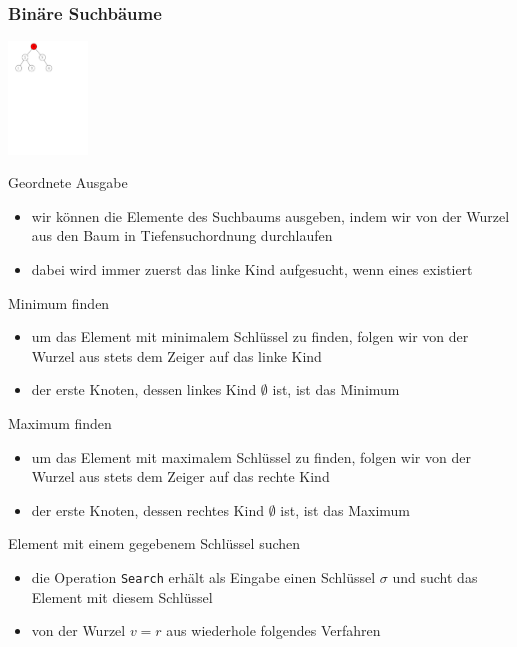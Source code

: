 \documentclass[aspectratio=1610, 11pt]{beamer}
\newcommand{\mytitle}{Bin\"are Suchb\"aume}
\begin{document}
\begin{frame}\frametitle{\mytitle}
	\hfill\includegraphics[height=30mm]{./images/binary_searchtree.pdf}
	\begin{overprint}
		\begin{exampleblock}{Geordnete Ausgabe}
			\begin{itemize}
				\item wir k\"onnen die Elemente des Suchbaums ausgeben, indem wir von der Wurzel aus den Baum in Tiefensuchordnung durchlaufen
				\item dabei wird immer \alert{zuerst} das linke Kind aufgesucht, wenn eines existiert
			\end{itemize}
		\end{exampleblock}
		\begin{exampleblock}{Minimum finden}
			\begin{itemize}
				\item um das Element mit minimalem Schl\"ussel zu finden, folgen wir von der Wurzel aus stets dem Zeiger auf das linke Kind
				\item der erste Knoten, dessen linkes Kind $\emptyset$ ist, ist das Minimum
			\end{itemize}
		\end{exampleblock}
		\begin{exampleblock}{Maximum finden}
			\begin{itemize}
				\item um das Element mit maximalem Schl\"ussel zu finden, folgen wir von der Wurzel aus stets dem Zeiger auf das rechte Kind
				\item der erste Knoten, dessen rechtes Kind $\emptyset$ ist, ist das Maximum
			\end{itemize}
		\end{exampleblock}
		\begin{exampleblock}{Element mit einem gegebenem Schl\"ussel suchen}
			\begin{itemize}
				\item die Operation {\tt Search} erh\"alt als Eingabe einen Schl\"ussel $\sigma$ und sucht das Element mit diesem Schl\"ussel
				\item von der Wurzel $v=r$ aus wiederhole folgendes Verfahren

\end{itemize}
\end{exampleblock}
\end{overprint}
\end{frame}
\end{document}
